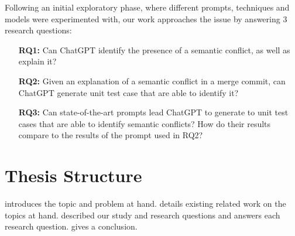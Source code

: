 Following an initial exploratory phase, where different prompts, techniques and models were experimented with, our work approaches the issue by answering
3 research questions:

\begin{itemize}
    \item[\textbf{RQ1:}] Can ChatGPT identify the presence of a semantic conflict, as well as explain it?
  
    \item[\textbf{RQ2:}] Given an explanation of a semantic conflict in a merge
    commit, can ChatGPT generate unit test case that are able to identify it?
  
    \item[\textbf{RQ3:}] Can state-of-the-art prompts lead ChatGPT to generate to
    unit test cases that are able to identify semantic conflicts?  How do their
    results compare to the results of the prompt used in RQ2?
  \end{itemize}

\section{Thesis Structure} \label{sec:struct}


 introduces the topic and problem at hand.
 details existing related work on the topics at hand.
 described our study and research questions and  answers each research question.
 gives a conclusion.
